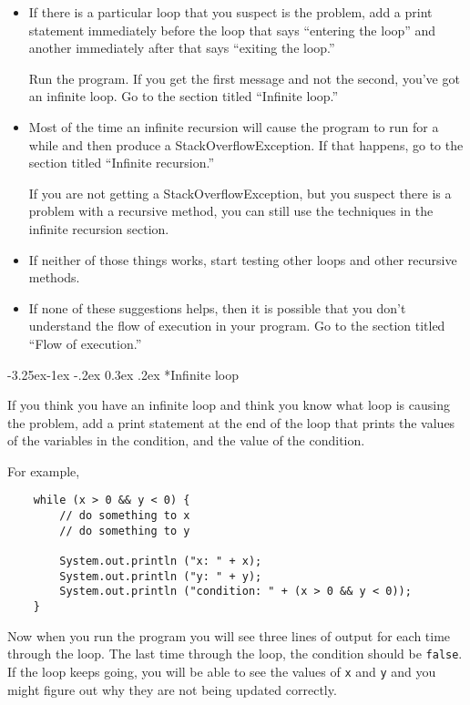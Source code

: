 \documentclass{book}
\makeatletter
\renewcommand\subsubsection{\@startsection {subsubsection}{3}{0mm}%
    {-3.25ex\@plus -1ex \@minus -.2ex}%
    {0.3ex \@plus .2ex}%
    {\normalfont\normalsize\bfseries}}
\makeatother
\begin{document}
\begin{itemize}

\item If there is a particular loop that you suspect is the
problem, add a print statement immediately before the loop
that says
``entering the loop'' and another immediately after that
says ``exiting the loop.''

Run the program.  If you get the first message and not
the second, you've got an infinite loop.  Go to the section
titled ``Infinite loop.''

\item Most of the time an infinite recursion will cause the program
to run for a while and then produce a StackOverflowException.
If that happens, go to the section
titled ``Infinite recursion.''

If you are not getting a StackOverflowException, but you suspect
there is a problem with a recursive method, you can still use
the techniques in the infinite recursion section.

\item If neither of those things works, start testing other
loops and other recursive methods.

\item If none of these suggestions helps, then it is possible that
you don't understand the flow of execution in your program.
Go to the section titled ``Flow of execution.''

\end{itemize}


\subsubsection*{Infinite loop}

If you think you have an infinite loop and think you know
what loop is causing the problem, add a print statement at
the end of the loop that prints the values of the variables in
the condition, and the value of the condition.

For example,

\begin{verbatim}
    while (x > 0 && y < 0) {
        // do something to x
        // do something to y

        System.out.println ("x: " + x);
        System.out.println ("y: " + y);
        System.out.println ("condition: " + (x > 0 && y < 0));
    }
\end{verbatim}
%
Now when you run the program you will see three lines of output
for each time through the loop.  The last time through the
loop, the condition should be {\tt false}.  If the loop keeps
going, you will be able to see the values of {\tt x} and {\tt y}
and you might figure out why they are not being updated correctly.
\end{document}
